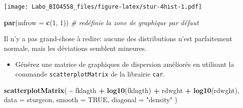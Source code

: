 \documentclass[
  12pt,
]{book}
\newenvironment{Shaded}{\begin{snugshade}}{\end{snugshade}}
\newcommand{\CommentTok}[1]{\textcolor[rgb]{0.56,0.35,0.01}{\textit{#1}}}
\newcommand{\DataTypeTok}[1]{\textcolor[rgb]{0.13,0.29,0.53}{#1}}
\newcommand{\DecValTok}[1]{\textcolor[rgb]{0.00,0.00,0.81}{#1}}
\newcommand{\KeywordTok}[1]{\textcolor[rgb]{0.13,0.29,0.53}{\textbf{#1}}}
\newcommand{\NormalTok}[1]{#1}
\newcommand{\OperatorTok}[1]{\textcolor[rgb]{0.81,0.36,0.00}{\textbf{#1}}}
\newcommand{\OtherTok}[1]{\textcolor[rgb]{0.56,0.35,0.01}{#1}}
\newcommand{\StringTok}[1]{\textcolor[rgb]{0.31,0.60,0.02}{#1}}
\providecommand{\tightlist}{%
  \setlength{\itemsep}{0pt}\setlength{\parskip}{0pt}}
\begin{document}
\begin{Shaded}
\end{Shaded}

\texttt{[image: Labo\_BIO4558\_files/figure-latex/stur-4hist-1.pdf]}

\begin{Shaded}
\begin{Highlighting}[]
\KeywordTok{par}\NormalTok{(}\DataTypeTok{mfrow =} \KeywordTok{c}\NormalTok{(}\DecValTok{1}\NormalTok{, }\DecValTok{1}\NormalTok{)) }\CommentTok{\# redéfinie la zone de graphique par défaut}
\end{Highlighting}
\end{Shaded}

Il n'y a pas grand-chose à redire: aucune des distributions n'est
parfaitement normale, mais les déviations semblent mineures.

\begin{itemize}
\tightlist
\item
  Générez une matrice de graphiques de dispersion améliorés en utilisant la commande \texttt{scatterplotMatrix} de la librairie \texttt{car}.
\end{itemize}

\begin{Shaded}
\begin{Highlighting}[]
\KeywordTok{scatterplotMatrix}\NormalTok{(}
  \OperatorTok{\textasciitilde{}}\StringTok{ }\NormalTok{fklngth }\OperatorTok{+}\StringTok{ }\KeywordTok{log10}\NormalTok{(fklngth) }\OperatorTok{+}\StringTok{ }\NormalTok{rdwght }\OperatorTok{+}\StringTok{ }\KeywordTok{log10}\NormalTok{(rdwght),}
  \DataTypeTok{data =}\NormalTok{ sturgeon,}
  \DataTypeTok{smooth =} \OtherTok{TRUE}\NormalTok{, }\DataTypeTok{diagonal =} \StringTok{"density"}
\NormalTok{)}
\end{Highlighting}
\end{Shaded}
\end{document}
